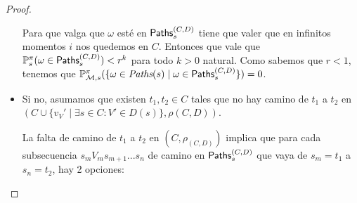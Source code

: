 \begin{proof}
\begin{itemize}
		      Para que valga que $\omega$ esté en $\textsf{Paths}_s^{(C,D)}$ tiene que valer que en
		      infinitos momentos $i$ nos quedemos en $C$. Entonces que vale que $\mathbb{P}_s^\pi
			      (\omega \in \textsf{Paths}_s^{(C,D)}) < r^k$ para todo $k > 0$ natural. Como sabemos
		      que $r < 1$, tenemos que $\mathbb{P}^\pi_{\mathcal{M}, s}(\{ \omega \in \textit{Paths}(s) \mid \omega
			      \in \textsf{Paths}_s^{(C,D)}\}) = 0$.








		\item Si no, asumamos que existen $t_1, t_2 \in C$ tales que no hay camino de $t_1$ a
		      $t_2$ en $(C \cup \{v_V' \mid \exists s \in C : V' \in D(s)\}, \rho(C,D))$.

		      La falta de camino de $t_1$ a $t_2$ en $(C, \rho_{(C,D)})$ implica que para
		      cada subsecuencia $s_m V_m s_{m+1} ... s_n$ de camino en $\textsf{Paths}_s^{(C,D)}$ que
		      vaya de $s_m=t_1$ a $s_n=t_2$, hay 2 opciones:


\end{itemize}
\end{proof}
